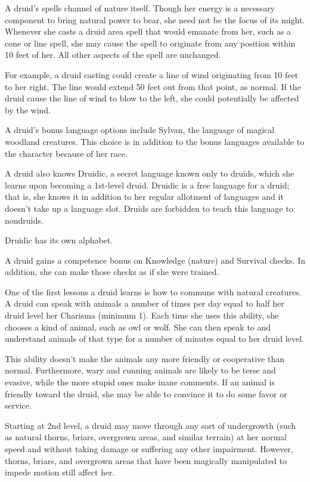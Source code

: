  A druid's spells channel of nature itself. Though her energy is a necessary component to bring natural power to bear, she need not be the focus of its might. Whenever she casts a druid area spell that would emanate from her, such as a cone or line spell, she may cause the spell to originate from any position within 10 feet of her. All other aspects of the spell are unchanged.

For example, a druid casting  could create a line of wind originating from 10 feet to her right. The line would extend 50 feet out from that point, as normal. If the druid cause the line of wind to blow to the left, she could potentially be affected by the wind.

 A druid's bonus language options include Sylvan, the language of magical woodland creatures. This choice is in addition to the bonus languages available to the character because of her race.

A druid also knows Druidic, a secret language known only to druids, which she learns upon becoming a 1st-level druid. Druidic is a free language for a druid; that is, she knows it in addition to her regular allotment of languages and it doesn't take up a language slot. Druids are forbidden to teach this language to nondruids.

Druidic has its own alphabet.

 A druid gains a  competence bonus on Knowledge (nature) and Survival checks. In addition, she can make those checks as if she were trained.

 One of the first lessons a druid learns is how to commune with natural creatures. A druid can speak with animals a number of times per day equal to half her druid level \add her Charisma (minimum 1). Each time she uses this ability, she chooses a kind of animal, such as owl or wolf. She can then speak to and understand animals of that type for a number of minutes equal to her druid level.

This ability doesn't make the animals any more friendly or cooperative than normal. Furthermore, wary and cunning animals are likely to be terse and evasive, while the more stupid ones make inane comments. If an animal is friendly toward the druid, she may be able to convince it to do some favor or service.

 Starting at 2nd level, a druid may move through any sort of undergrowth (such as natural thorns, briars, overgrown areas, and similar terrain) at her normal speed and without taking damage or suffering any other impairment. However, thorns, briars, and overgrown areas that have been magically manipulated to impede motion still affect her.

